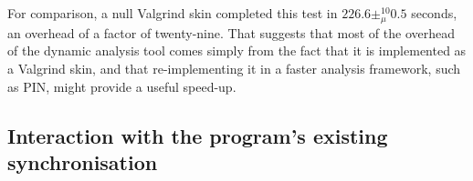 For comparison, a null Valgrind skin completed this test in $226.6
\pm_\mu^{10} 0.5$ seconds, an overhead of a factor of twenty-nine.  That
suggests that most of the overhead of the dynamic analysis tool comes
simply from the fact that it is implemented as a Valgrind skin, and
that re-implementing it in a faster analysis framework, such as
PIN\cite{Luk2005}, might provide a useful speed-up.

\subsection{Interaction with the program's existing synchronisation}

\begin{sanefig}
  \hspace{-2mm}
  \hfill
\end{sanefig}
